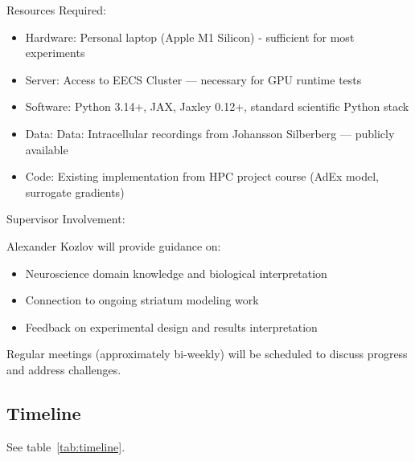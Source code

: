 \documentclass{article}
\begin{document}
Resources Required:

\begin{itemize}
    \item Hardware: Personal laptop (Apple M1 Silicon) - sufficient for most experiments
    \item Server: Access to EECS Cluster --- necessary for GPU runtime tests
    \item Software: Python 3.14+, JAX, Jaxley 0.12+, standard scientific Python stack
    \item Data: Data: Intracellular recordings from Johansson Silberberg \cite{Johansson2020} --- publicly available
    \item Code: Existing implementation from HPC project course (AdEx model, surrogate gradients)
\end{itemize}

Supervisor Involvement:

Alexander Kozlov will provide guidance on:

\begin{itemize}
    \item Neuroscience domain knowledge and biological interpretation
    \item Connection to ongoing striatum modeling work
    \item Feedback on experimental design and results interpretation
\end{itemize}

Regular meetings (approximately bi-weekly) will be scheduled to discuss progress and address challenges.

\subsection{Timeline}
See table~\ref{tab:timeline}.
\end{document}
